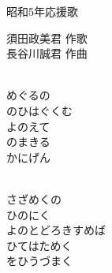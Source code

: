 \documentclass[10pt,b5j]{tarticle} %
\begin{document}
\begin{minipage}[c]{0.7\hsize} %
    \begin{center}
        {\LARGE
            昭和5年応援歌 %
        }
        {\small 
        }
    \end{center}
\end{minipage}
\begin{minipage}[c]{0.3\hsize} %
    \begin{flushright} %
        須田政美君 作歌\\長谷川誠君 作曲 %
    \end{flushright}
\end{minipage}

\vspace{1.5em} %
\newcommand{\linespace}{0.5em} %
\newcommand{\blocksize}{0.5\hsize} %
\newcommand{\itemmargin}{3em} %
\begin{enumerate} %
    \setlength{\itemindent}{\itemmargin} %
    \begin{minipage}[c]{\blocksize}
    
        \vspace{\linespace}
        \item~\\
        めぐるの\\
        のひはぐくむ\\
        よのえて\\
        のまきる\\
        かにげん
        
    \end{minipage}
    \begin{minipage}[c]{\blocksize}
        
        \vspace{\linespace}
        \item~\\
        さざめくの\\
        ひのにく\\
        よのとどろきすめば\\
        ひてはためく\\
        をひうづまく
    
    \end{minipage}
\end{enumerate} %
\end{document}
